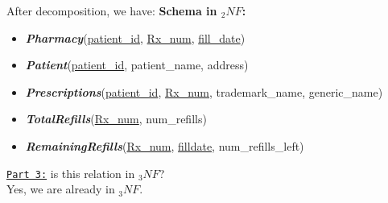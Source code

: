 \documentclass[letterpaper, 11pt]{article}
\newcommand{\1}{\mathds{1}}	%
\theoremstyle{definition}
\begin{document}
\bigbreak \noindent
After decomposition, we have:
\bigbreak \noindent
\textbf{Schema in $_2NF$:} 
\begin{itemize}
    \item[\ding{221}] \textit{\textbf{Pharmacy}}(\underline{patient\_id}, \underline{Rx\_num}, \underline{fill\_date})
    \item[\ding{221}] \textit{\textbf{Patient}}(\underline{patient\_id}, patient\_name, address)
    \item[\ding{221}]  \textit{\textbf{Prescriptions}}(\underline{patient\_id}, \underline{Rx\_num}, trademark\_name, generic\_name)
    \item[\ding{221}] \textit{\textbf{TotalRefills}}(\underline{Rx\_num}, num\_refills)
    \item[\ding{221}] \textit{\textbf{RemainingRefills}}(\underline{Rx\_num}, \underline{filldate}, num\_refills\_left)
\end{itemize}
\bigbreak \noindent
\underline{\texttt{Part 3:}} is this relation in $_3NF$? \\
Yes, we are already in $_3NF$.
\end{document}
